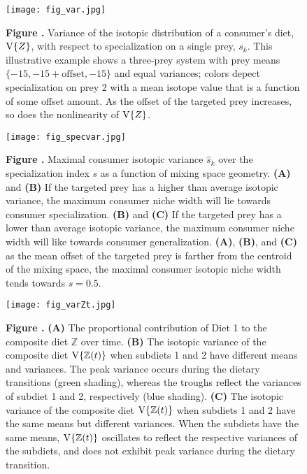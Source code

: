 \documentclass{frontiersSCNS}
\begin{document}
\newpage


\begin{figure}[h!]
\begin{center}
\texttt{[image: fig\_var.jpg]}
\end{center}
\textbf{\label{figvar} Figure .}{
Variance of the isotopic distribution of a consumer's diet, ${\rm V}\{Z\}$, with respect to specialization on a single prey, $s_k$.
This illustrative example shows a three-prey system with prey means $\{-15,-15+\mbox{offset},-15\}$ and equal variances; colors depect specialization on prey 2 with a mean isotope value that is a function of some offset amount.
As the offset of the targeted prey increases, so does the nonlinearity of ${\rm V}\{Z\}$.
}
\end{figure}

\begin{figure}[h!]
\begin{center}
\texttt{[image: fig\_specvar.jpg]}
\end{center}
\textbf{\label{figspecvar} Figure .}{
Maximal consumer isotopic variance $\hat s_k$ over the specialization index $s$ as a function of mixing space geometry. 
{\bf(A)} and {\bf (B)} If the targeted prey has a higher than average isotopic variance, the maximum consumer niche width will lie towards consumer specialization.
{\bf (B)} and {\bf(C)} If the targeted prey has a lower than average isotopic variance, the maximum consumer niche width will like towards consumer generalization.
{\bf(A)}, {\bf (B)}, and {\bf(C)} as the mean offset of the targeted prey is farther from the centroid of the mixing space, the maximal consumer isotopic niche width tends towards $s=0.5$.
}
\end{figure}


\begin{figure}[h!]
\begin{center}
\texttt{[image: fig\_varZt.jpg]}
\end{center}
\textbf{\label{figvarZt} Figure .}{
{\bf(A)} The proportional contribution of Diet 1 to the composite diet $\mathbb{Z}$ over time.
{\bf(B)} The isotopic variance of the composite diet ${\rm V}\{\mathbb{Z}(t)\}$ when subdiets 1 and 2 have different means and variances. The peak variance occurs during the dietary transitions (green shading), whereas the troughs reflect the variances of subdiet 1 and 2, respectively (blue shading).
{\bf(C)} The isotopic variance of the composite diet ${\rm V}\{\mathbb{Z}(t)\}$ when subdiets 1 and 2 have the same means but different variances. When the subdiets have the same means, ${\rm V}\{\mathbb{Z}(t)\}$ oscillates to reflect the respective variances of the subdiets, and does not exhibit peak variance during the dietary transition.
}
\end{figure}
\end{document}
